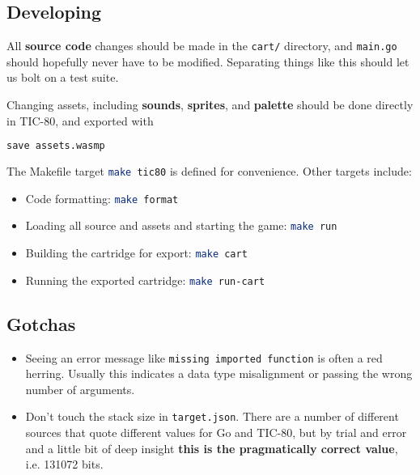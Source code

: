 \documentclass{article}
\begin{document}
\subsection{Developing}

\noindent All \textbf{source code} changes should be made in the \lstinline|cart/| directory, and \lstinline[language=Bash]|main.go| should hopefully never have to be modified. Separating things like this should let us bolt on a test suite.

Changing assets, including \textbf{sounds}, \textbf{sprites}, and \textbf{palette} should be done directly in TIC-80, and exported with
\\
\begin{lstlisting}[language=Bash]
save assets.wasmp
\end{lstlisting}

\noindent The Makefile target \lstinline[language=Bash]|make tic80| is defined for convenience. Other targets include:

\noindent

\begin{itemize}
    \item Code formatting: \lstinline[language=Bash]|make format|
    \item Loading all source and assets and starting the game: \lstinline[language=Bash]|make run|
    \item Building the cartridge for export: \lstinline[language=Bash]|make cart|
    \item Running the exported cartridge: \lstinline[language=Bash]|make run-cart|
\end{itemize}

\subsection{Gotchas}

\begin{itemize}
    \item Seeing an error message like \lstinline|missing imported function| is often a red herring. Usually this indicates a data type misalignment or passing the wrong number of arguments.
    \item Don't touch the stack size in \lstinline|target.json|. There are a number of different sources that quote different values for Go and TIC-80, but by trial and error and a little bit of deep insight \textbf{this is the pragmatically correct value}, i.e. 131072 bits.
\end{itemize}
\end{document}
